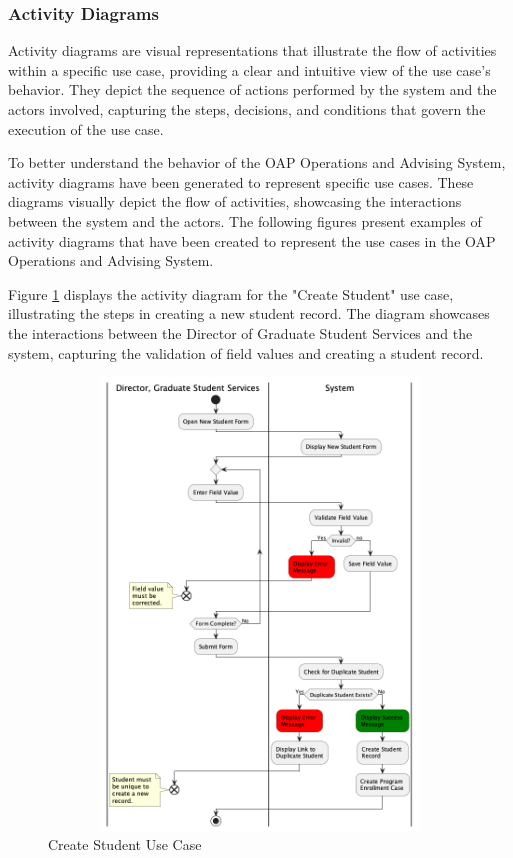 \documentclass[12pt]{article}
\begin{document}
\subsubsection{Activity Diagrams}
Activity diagrams are visual representations that illustrate the flow of activities within a specific use case, providing a clear and intuitive view of the use case's behavior. They depict the sequence of actions performed by the system and the actors involved, capturing the steps, decisions, and conditions that govern the execution of the use case.

To better understand the behavior of the OAP Operations and Advising System, activity diagrams have been generated to represent specific use cases. These diagrams visually depict the flow of activities, showcasing the interactions between the system and the actors. The following figures present examples of activity diagrams that have been created to represent the use cases in the OAP Operations and Advising System.

Figure \ref{fig:create_student_use_case} displays the activity diagram for the "Create Student" use case, illustrating the steps in creating a new student record. The diagram showcases the interactions between the Director of Graduate Student Services and the system, capturing the validation of field values and creating a student record.

\begin{figure}[ht]
    \centering
    \caption{Create Student Use Case}
    \label{fig:create_student_use_case}
    \includegraphics[width=12cm,height=12cm]{create-student}
\end{figure}
\end{document}
